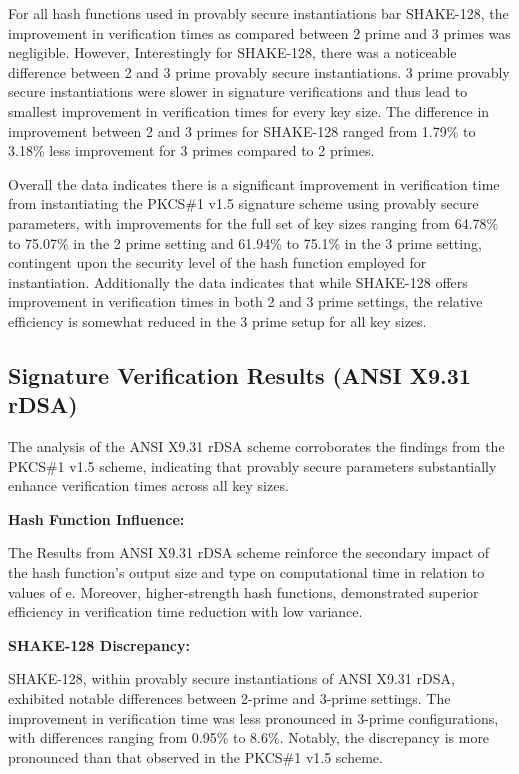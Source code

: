 \documentclass[]{final_report}
\theoremstyle{definition}
\begin{document}
For all hash functions used in provably secure instantiations bar SHAKE-128, the improvement in verification times as compared between 2 prime and 3 primes was negligible. However, Interestingly for SHAKE-128, there was a noticeable difference between 2 and 3 prime provably secure instantiations. 3 prime provably secure instantiations were slower in signature verifications and thus lead to smallest improvement in verification times for every key size. The difference in improvement between 2 and 3 primes for SHAKE-128 ranged from 1.79\% to 3.18\%  less improvement for 3 primes compared to 2 primes.


Overall the data indicates there is a significant improvement in verification time from instantiating the PKCS\#1 v1.5 signature scheme using provably secure parameters, with improvements for the full set of key sizes ranging from 64.78\% to 75.07\% in the 2 prime setting and 61.94\% to 75.1\% in the 3 prime setting, contingent upon the security level of the hash function employed for instantiation. Additionally the data indicates that while SHAKE-128 offers improvement in verification times in both 2 and 3 prime settings, the relative efficiency is somewhat reduced in the 3 prime setup for all key sizes.

\subsection{Signature Verification Results (ANSI X9.31 rDSA)}

The analysis of the ANSI X9.31 rDSA scheme corroborates the findings from the PKCS\#1 v1.5 scheme, indicating that provably secure parameters substantially enhance verification times across all key sizes.

\textbf{Hash Function Influence:}  

The Results from ANSI X9.31 rDSA scheme reinforce the secondary impact of the hash function's output size and type on computational time in relation to values of e. Moreover, higher-strength hash functions, demonstrated superior efficiency in verification time reduction with low variance.

\textbf{SHAKE-128 Discrepancy:} 

SHAKE-128, within provably secure instantiations of ANSI X9.31 rDSA, exhibited notable differences between 2-prime and 3-prime settings. The improvement in verification time was less pronounced in 3-prime configurations, with differences ranging from 0.95\% to 8.6\%. Notably, the discrepancy is more pronounced than that observed in the PKCS\#1 v1.5 scheme.
\end{document}
